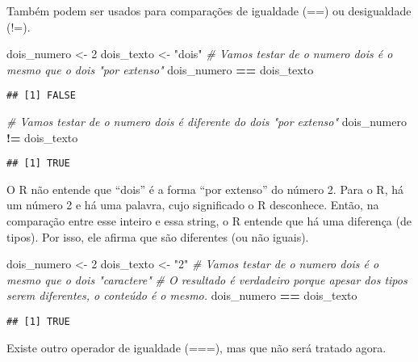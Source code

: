 \documentclass[
]{book}
\newenvironment{Shaded}{\begin{snugshade}}{\end{snugshade}}
\newcommand{\CommentTok}[1]{\textcolor[rgb]{0.56,0.35,0.01}{\textit{#1}}}
\newcommand{\DecValTok}[1]{\textcolor[rgb]{0.00,0.00,0.81}{#1}}
\newcommand{\NormalTok}[1]{#1}
\newcommand{\OperatorTok}[1]{\textcolor[rgb]{0.81,0.36,0.00}{\textbf{#1}}}
\newcommand{\StringTok}[1]{\textcolor[rgb]{0.31,0.60,0.02}{#1}}
\begin{document}
Também podem ser usados para comparações de igualdade (==) ou desigualdade (!=).

\begin{Shaded}
\begin{Highlighting}[]
\NormalTok{dois_numero <-}\StringTok{ }\DecValTok{2}
\NormalTok{dois_texto <-}\StringTok{ "dois"}
\CommentTok{# Vamos testar de o numero dois é o mesmo que o dois "por extenso"}
\NormalTok{dois_numero }\OperatorTok{==}\StringTok{ }\NormalTok{dois_texto}
\end{Highlighting}
\end{Shaded}

\begin{verbatim}
## [1] FALSE
\end{verbatim}

\begin{Shaded}
\begin{Highlighting}[]
\CommentTok{# Vamos testar de o numero dois é diferente do dois "por extenso"}
\NormalTok{dois_numero }\OperatorTok{!=}\StringTok{ }\NormalTok{dois_texto}
\end{Highlighting}
\end{Shaded}

\begin{verbatim}
## [1] TRUE
\end{verbatim}

O R não entende que ``dois'' é a forma ``por extenso'' do número 2. Para o R, há um número 2 e há uma palavra, cujo significado o R desconhece. Então, na comparação entre esse inteiro e essa string, o R entende que há uma diferença (de tipos). Por isso, ele afirma que são diferentes (ou não iguais).

\begin{Shaded}
\begin{Highlighting}[]
\NormalTok{dois_numero <-}\StringTok{ }\DecValTok{2}
\NormalTok{dois_texto <-}\StringTok{ "2"}
\CommentTok{# Vamos testar de o numero dois é o mesmo que o dois "caractere"}
\CommentTok{# O resultado é verdadeiro porque apesar dos tipos serem diferentes, o conteúdo é o mesmo.}
\NormalTok{dois_numero }\OperatorTok{==}\StringTok{ }\NormalTok{dois_texto}
\end{Highlighting}
\end{Shaded}

\begin{verbatim}
## [1] TRUE
\end{verbatim}

Existe outro operador de igualdade (===), mas que não será tratado agora.
\end{document}
